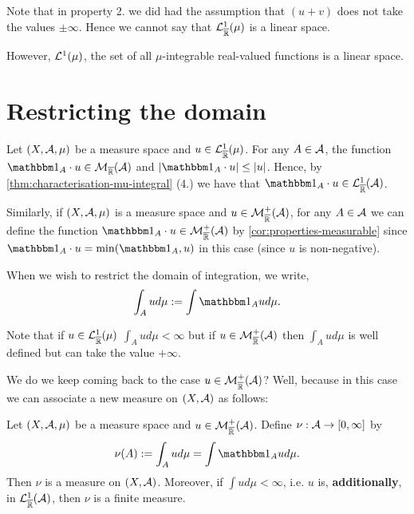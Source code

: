 \begin{remark}
	Note that in property 2. we did had the assumption that $(u + v)$ does not take the values $\pm \infty$. Hence we cannot say that $\mathcal{L}^1_{\overline{\mathbb{R}}}(\mu)$ is a linear space.
	
	However, $\mathcal{L}^1(\mu)$, the set of all $\mu$-integrable real-valued functions is a linear space.
\end{remark}

\section{Restricting the domain}

Let $(X, \mathcal{A}, \mu)$ be a measure space and $u \in \mathcal{L}^1_{\overline{\mathbb{R}}}(\mu)$. For any $A \in \mathcal{A}$, the function $\ind_A \cdot u \in \calM_\Rb(\sa)$ and $\abs{\ind_A \cdot u} \leq \abs{u}$. Hence, by \autoref{thm:characterisation-mu-integral} (4.) we have that $\ind_A \cdot u \in \calL^1_\Rb(\sa)$.

Similarly, if $(X, \mathcal{A}, \mu)$ is a measure space and $u \in \mathcal{M}_{\overline{\mathbb{R}}}^+(\mathcal{A})$, for any $A \in \mathcal{A}$ we can define the function $\ind_A \cdot u \in \calM_\Rb^+(\sa)$ by \autoref{cor:properties-measurable} since $\ind_A \cdot u = \min (\ind_A, u)$ in this case (since $u$ is non-negative).

When we wish to restrict the domain of integration, we write,
\begin{align}
	\int_A u d\mu := \int \ind_A u d\mu.
\end{align}

Note that if $u \in \mathcal{L}^1_{\overline{\mathbb{R}}}(\mu)$ $\int_A u d\mu < \infty$ but if $u \in \mathcal{M}^+_{\overline{\mathbb{R}}}(\mathcal{A})$ then $\int_A u d\mu$ is well defined but can take the value $+\infty$.

We do we keep coming back to the case $u \in \mathcal{M}^+_{\overline{\mathbb{R}}}(\mathcal{A})$? Well, because in this case we can associate a new measure on $(X, \mathcal{A})$ as follows:

\begin{lem}
	Let $(X, \mathcal{A}, \mu)$ be a measure space and $u \in \mathcal{M}^+_{\overline{\mathbb{R}}}(\mathcal{A})$. Define $\nu : \mathcal{A} \to [0, \infty]$ by
	\begin{align}
		\nu(A) := \int_A ud\mu = \int \ind_A u d\mu.
	\end{align}
	Then $\nu$ is a measure on $(X,\mathcal{A})$. Moreover, if $\int u d\mu < \infty$, i.e. $u$ is, \textbf{additionally}, in  $\mathcal{L}_{\overline{\mathbb{R}}}^1(\mathcal{A})$, then $\nu$ is a finite measure.
\end{lem}

